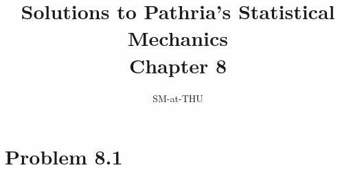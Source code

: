 \documentclass{article}
\author{SM-at-THU}
\title{\bf{Solutions to Pathria's Statistical Mechanics}\\Chapter 8}
\begin{document}
\maketitle
\section*{Problem 8.1}
\end{document}
